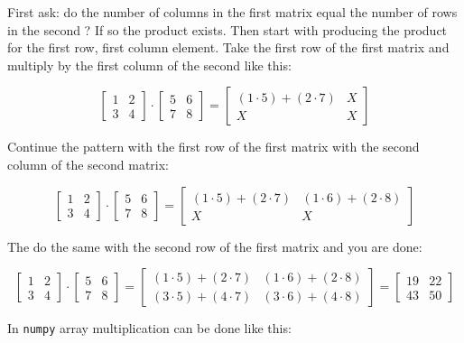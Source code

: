 First ask: do the number of columns in the first matrix equal the number
of rows in the second ? If so the product exists. Then start with
producing the product for the first row, first column element. Take the
first row of the first matrix and multiply by the first column of the
second like this:

\[ 
\begin{bmatrix}
1 & 2 \\
3 & 4
\end{bmatrix}
\cdot
\begin{bmatrix}
5 & 6 \\
7 & 8
\end{bmatrix}
=
\begin{bmatrix}
(1\cdot 5) + (2\cdot 7) & X \\
X & X
\end{bmatrix}
\]

Continue the pattern with the first row of the first matrix with the
second column of the second matrix:

\[ 
\begin{bmatrix}
1 & 2 \\
3 & 4
\end{bmatrix}
\cdot
\begin{bmatrix}
5 & 6 \\
7 & 8
\end{bmatrix}
=
\begin{bmatrix}
(1\cdot 5) + (2\cdot 7) & (1\cdot 6) + (2\cdot 8)  \\
X & X
\end{bmatrix}
\]

The do the same with the second row of the first matrix and you are
done:

\[ 
\begin{bmatrix}
1 & 2 \\
3 & 4
\end{bmatrix}
\cdot
\begin{bmatrix}
5 & 6 \\
7 & 8
\end{bmatrix}
=
\begin{bmatrix}
(1\cdot 5) + (2\cdot 7) & (1\cdot 6) + (2\cdot 8)  \\
(3\cdot 5) + (4\cdot 7) & (3\cdot 6) + (4\cdot 8) 
\end{bmatrix}
=
\begin{bmatrix}
19 & 22 \\
43 & 50 
\end{bmatrix}
\]

In \texttt{numpy} array multiplication can be done like this:

